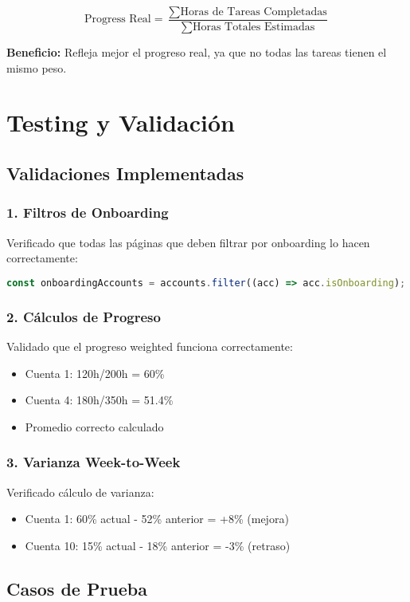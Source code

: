 \documentclass[12pt,a4paper]{article}
\begin{document}
\[
\text{Progress Real} = \frac{\sum \text{Horas de Tareas Completadas}}{\sum \text{Horas Totales Estimadas}}
\]

\textbf{Beneficio:} Refleja mejor el progreso real, ya que no todas las tareas tienen el mismo peso.

\section{Testing y Validación}

\subsection{Validaciones Implementadas}

\subsubsection{1. Filtros de Onboarding}
Verificado que todas las páginas que deben filtrar por onboarding lo hacen correctamente:
\begin{lstlisting}[language=JavaScript]
const onboardingAccounts = accounts.filter((acc) => acc.isOnboarding);
\end{lstlisting}

\subsubsection{2. Cálculos de Progreso}
Validado que el progreso weighted funciona correctamente:
\begin{itemize}
    \item Cuenta 1: 120h/200h = 60\%
    \item Cuenta 4: 180h/350h = 51.4\%
    \item Promedio correcto calculado
\end{itemize}

\subsubsection{3. Varianza Week-to-Week}
Verificado cálculo de varianza:
\begin{itemize}
    \item Cuenta 1: 60\% actual - 52\% anterior = +8\% (mejora)
    \item Cuenta 10: 15\% actual - 18\% anterior = -3\% (retraso)
\end{itemize}

\subsection{Casos de Prueba}
\end{document}
